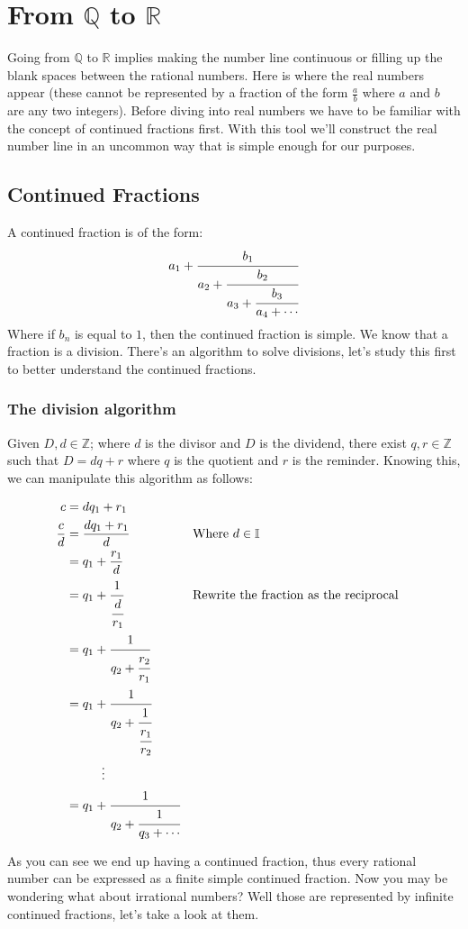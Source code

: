 \documentclass{report}
\begin{document}
    \tableofcontents

    \pagebreak
    \chapter{ From $\mathbb{Q}$ to $\mathbb{R}$ }
        Going from $\mathbb{Q}$ to $\mathbb{R}$ implies making the number line continuous or filling up the blank spaces between the rational numbers. Here is where the real numbers appear (these cannot be represented by a fraction of the form $\frac{a}{b}$ where $a$ and $b$ are any two integers). Before diving into real numbers we have to be familiar with the concept of continued fractions first. With this tool we'll construct the real number line in an uncommon way that is simple enough for our purposes.

        \section{Continued Fractions}
            A continued fraction is of the form:
            \[
                a_1 + \cfrac{b_1}{a_2 + \cfrac{b_2}{a_3 + \cfrac{b_3}{a_4 + \cdots}}}
            \]
            Where if $b_n$ is equal to $1$, then the continued fraction is simple. We know that a fraction is a division. There's an algorithm to solve divisions, let's study this first to better understand the continued fractions.

            \subsection*{The division algorithm}
                Given $D, d \in \mathbb{Z}$; where $d$ is the divisor and $D$ is the dividend, there exist $q, r \in \mathbb{Z}$ such that $D = dq+r$ where $q$ is the quotient and $r$ is the reminder. Knowing this, we can manipulate this algorithm as follows:

                \begin{align*}
                    c &= dq_1+r_1\\
                    \frac{c}{d} &= \frac{dq_1+r_1}{d} && \text{Where } d\in\mathbb{I}\\
                    &= q_1 + \frac{r_1}{d}\\
                    &= q_1 + \cfrac{1}{\cfrac{d}{r_1}}  && \text{Rewrite the fraction as the reciprocal}\\
                    &= q_1 + \cfrac{1}{q_2 + \cfrac{r_2}{r_1}} \\
                    &= q_1 + \cfrac{1}{q_2 + \cfrac{1}{\cfrac{r_1}{r_2}}} \\
                    &\hspace{1cm}\vdots\\
                    &= q_1 + \cfrac{1}{q_2 + \cfrac{1}{q_3 + \cdots}}\\
                \end{align*}

                As you can see we end up having a continued fraction, thus every rational number can be expressed as a finite simple continued fraction. Now you may be wondering what about irrational numbers? Well those are represented by infinite continued fractions, let's take a look at them.
\end{document}
